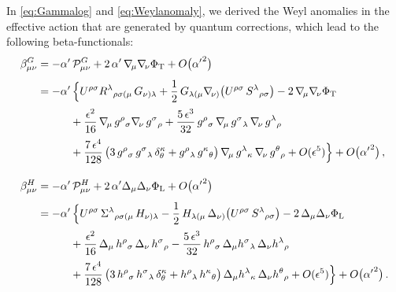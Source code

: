 \documentclass[11pt]{article}
\newcommand{\CP}{\mathcal{P}}
\newcommand{\lr}{\left (}
\newcommand{\rr}{\right )}
\begin{document}
In \eqref{eq:Gammalog} and \eqref{eq:Weylanomaly}, we derived the Weyl anomalies in the effective action that are generated by quantum corrections, which lead to the following beta-functionals:
%
\begin{subequations} \label{eq:betaGH}
\begin{align}
	\beta_{\mu\nu}^G & = - \alpha' \, \CP_{\mu\nu}^G + 2 \, \alpha' \, \nabla_{\!\mu} \nabla_{\!\nu} \Phi_\text{T} + O\bigl({\alpha'}^2\bigr) \notag \\[4pt]
		& = - \alpha' \, \Bigl\{ U^{\rho\sigma} R^\lambda{}_{\rho\sigma(\mu} \, G_{\nu)\lambda}
		+ \frac{1}{2} \, G_{\lambda(\mu} \nabla_{\!\nu)} \! \lr U^{\rho\sigma} \, S^\lambda{}_{\rho\sigma} \rr 
		- 2 \, \nabla_{\!\mu} \nabla_{\!\nu} \Phi_\text{T} \notag \\[2pt]
		& \qquad \quad + \frac{\epsilon^2}{16} \, \nabla_{\!\mu} \, g^\rho{}_\sigma \nabla_{\!\nu} \, g^\sigma{}_{\rho}
		+ \frac{5 \, \epsilon^3}{32} \, g^\rho{}_\sigma \, \nabla_{\!\mu} \, g^\sigma{}_{\lambda} \, \nabla_{\!\nu} \, g^\lambda{}_{\rho} \notag \\[2pt]
		& \qquad \quad + \frac{7 \, \epsilon^4}{128} \, \bigl( 3 \, g^{\rho}{}_\sigma  \, g^\sigma{}_{\lambda} \, \delta^\kappa_\theta + g^\rho{}_\lambda \, g^\kappa{}_\theta \bigr) \, \nabla_{\!\mu} \, g^\lambda{}_{\kappa}  \, \nabla_{\!\nu} \, g^\theta{}_{\rho}
		+ O(\epsilon^5) \Bigr\} + O\bigl({\alpha'}^2 \bigr)\,, \\[10pt]
	\beta_{\mu\nu}^H & = - \alpha' \, \CP_{\mu\nu}^H + 2 \, \alpha' \Delta_{\mu} \Delta_{\nu} \Phi_\text{L} + O\bigl({\alpha'}^2\bigr) \notag \\[4pt]
		& = - \alpha' \, \Bigl\{  U^{\rho\sigma} \, \Sigma^\lambda{}_{\rho\sigma(\mu} \, H_{\nu)\lambda}
		- \frac{1}{2} \, H_{\lambda(\mu} \, \Delta_{\nu)} \! \lr U^{\rho\sigma} \, S^\lambda{}_{\rho\sigma} \rr - 2 \, \Delta_\mu \Delta_{\nu} \Phi_\text{L} \notag \\[2pt]
		& \qquad \quad + \frac{\epsilon^2}{16} \, \Delta_{\mu} \, h^\rho{}_\sigma\, \Delta_{\nu} \, h^\sigma{}_{\rho}
		- \frac{5 \, \epsilon^3}{32} \, h^\rho{}_\sigma \, \Delta_{\mu} h^\sigma{}_{\lambda} \, \Delta_{\nu} h^\lambda{}_{\rho} \notag \\[2pt]
		& \qquad \quad + \frac{7 \, \epsilon^4}{128} \, \bigl( 3 \, h^{\rho}{}_\sigma  \, h^\sigma{}_{\lambda} \, \delta^\kappa_\theta + h^\rho{}_\lambda \, h^\kappa{}_\theta \bigr) \, \Delta_{\mu} h^\lambda{}_{\kappa}  \, \Delta_{\nu} h^\theta{}_{\rho} 
		+ O(\epsilon^5)	\Bigr\} + O\bigl({\alpha'}^2 \bigr)\,.
\end{align}
\end{subequations}
\end{document}

